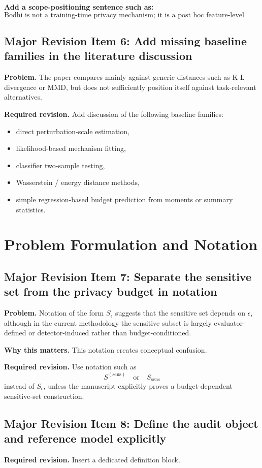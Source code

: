\textbf{Add a scope-positioning sentence such as:}
\[
\text{Bodhi is not a training-time privacy mechanism; it is a post hoc feature-level auditing framework.}
\]

\subsection*{Major Revision Item 6: Add missing baseline families in the literature discussion}
\textbf{Problem.} The paper compares mainly against generic distances such as K-L divergence or MMD, but does not sufficiently position itself against task-relevant alternatives.

\textbf{Required revision.}
Add discussion of the following baseline families:
\begin{itemize}
    \item direct perturbation-scale estimation,
    \item likelihood-based mechanism fitting,
    \item classifier two-sample testing,
    \item Wasserstein / energy distance methods,
    \item simple regression-based budget prediction from moments or summary statistics.
\end{itemize}

\section{Problem Formulation and Notation}

\subsection*{Major Revision Item 7: Separate the sensitive set from the privacy budget in notation}
\textbf{Problem.} Notation of the form $S_\epsilon$ suggests that the sensitive set depends on $\epsilon$, although in the current methodology the sensitive subset is largely evaluator-defined or detector-induced rather than budget-conditioned.

\textbf{Why this matters.} This notation creates conceptual confusion.

\textbf{Required revision.}
Use notation such as
\[
S^{(\mathrm{sens})}
\quad \text{or} \quad
S_{\mathrm{sens}}
\]
instead of $S_\epsilon$, unless the manuscript explicitly proves a budget-dependent sensitive-set construction.

\subsection*{Major Revision Item 8: Define the audit object and reference model explicitly}
\textbf{Required revision.}
Insert a dedicated definition block.

